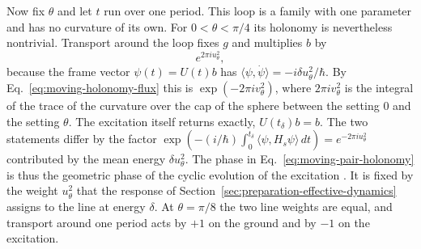 Now fix $\theta$ and let $t$ run over one period. This loop is a family with one parameter and has no curvature of its own. For $0<\theta<\pi/4$ its holonomy is nevertheless nontrivial. Transport around the loop fixes $g$ and multiplies $b$ by
\begin{equation}
 e^{2\pi iu_\theta^2} ,
 \label{eq:moving-pair-holonomy}
\end{equation}
because the frame vector $\psi(t)=U(t)b$ has $\langle\psi,\dot\psi\rangle=-i\delta u_\theta^2/\hbar$. By Eq.~\eqref{eq:moving-holonomy-flux} this is $\exp(-2\pi iv_\theta^2)$, where $2\pi iv_\theta^2$ is the integral of the trace of the curvature over the cap of the sphere between the setting $0$ and the setting $\theta$. The excitation itself returns exactly, $U(t_\delta)b=b$. The two statements differ by the factor $\exp(-(i/\hbar)\int_0^{t_\delta}\langle\psi,H_s\psi\rangle\,dt)=e^{-2\pi iu_\theta^2}$ contributed by the mean energy $\delta u_\theta^2$. The phase in Eq.~\eqref{eq:moving-pair-holonomy} is thus the geometric phase of the cyclic evolution of the excitation \cite{AharonovAnandan1987}. It is fixed by the weight $u_\theta^2$ that the response of Section~\ref{sec:preparation-effective-dynamics} assigns to the line at energy $\delta$. At $\theta=\pi/8$ the two line weights are equal, and transport around one period acts by $+1$ on the ground and by $-1$ on the excitation.
